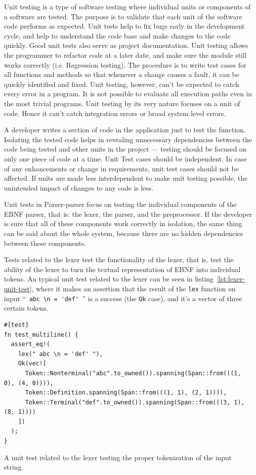 \documentclass[english,engineering]{wizthesis}
\newcommand{\paraphrase}[1]{#1}
\newcommand{\thisproject}{Parser-parser}
\begin{document}
\paraphrase{Unit testing is a type of software testing where individual units or
components of a software are tested. The purpose is to validate that each unit
of the software code performs as expected. Unit tests help to fix bugs early in
the development cycle, and help to understand the code base and make changes to
the code quickly. Good unit tests also serve as project documentation. Unit
testing allows the programmer to refactor code at a later date, and make sure
the module still works correctly (i.e. Regression testing). The procedure is to
write test cases for all functions and methods so that whenever a change causes
a fault, it can be quickly identified and fixed. Unit testing, however, can't be
expected to catch every error in a program. It is not possible to evaluate all
execution paths even in the most trivial programs. Unit testing by its very
nature focuses on a unit of code. Hence it can't catch integration errors or
broad system level errors.

A developer writes a section of code in the application just to test the
function. Isolating the tested code helps in revealing unnecessary dependencies
between the code being tested and other units in the project --- testing should
be focused on only one piece of code at a time. Unit Test cases should be
independent. In case of any enhancements or change in requirements, unit test
cases should not be affected. If units are made less interdependent to make unit
testing possible, the unintended impact of changes to any code is less.}

Unit tests in \thisproject{} focus on testing the individual components of the
EBNF parser, that is: the lexer, the parser, and the preprocessor. If the
developer is sure that all of these components work correctly in isolation, the
same thing can be said about the whole system, because there are no hidden
dependencies between these components.

Tests related to the lexer test the functionality of the lexer, that is, test
the ability of the lexer to turn the textual representation of EBNF into
individual tokens. An typical unit test related to the lexer can be seen in
listing~\ref{lst:lexer-unit-test}, where it makes an assertion that the result
of the \texttt{lex} function on input ``\verb*| abc \n = 'def' |'' is a success
(the \texttt{Ok} case), and it's a vector of three certain tokens.

\begin{listing}[H]
  \begin{verbatim}
#[test]
fn test_multiline() {
  assert_eq!(
    lex(" abc \n = 'def' "),
    Ok(vec![
      Token::Nonterminal("abc".to_owned()).spanning(Span::from(((1, 0), (4, 0)))),
      Token::Definition.spanning(Span::from(((1, 1), (2, 1)))),
      Token::Terminal("def".to_owned()).spanning(Span::from(((3, 1), (8, 1))))
    ])
  );
}
  \end{verbatim}
  \caption{A unit test related to the lexer testing the proper tokenization of
  the input string.}
  \label{lst:lexer-unit-test}
\end{listing}
\end{document}
